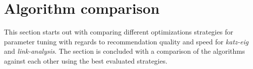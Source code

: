 
\section{Algorithm comparison}

This section starts out with comparing different optimizations strategies for parameter tuning with regards to recommendation quality and speed for \textit{katz-eig} and \textit{link-analysis}. The section is concluded with a comparison of the algorithms against each other using the best evaluated strategies.


\newpage


\newpage



